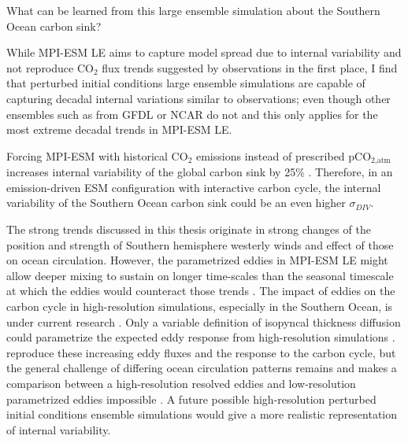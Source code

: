 \vspace{.5cm}

\label{sec:conlcusions}
What can be learned from this large ensemble simulation about the Southern Ocean carbon sink? 

While \acs{MPI-ESM LE} aims to capture model spread due to internal variability and not reproduce CO$_2$ flux trends suggested by observations in the first place, I find that perturbed initial conditions large ensemble simulations are capable of capturing decadal internal variations similar to observations; even though other ensembles such as from \acs{GFDL} or \acs{NCAR} do not and this only applies for the most extreme decadal trends in \acs{MPI-ESM LE}.

Forcing \acs{MPI-ESM} with historical CO$_2$ emissions instead of prescribed pCO$_{\text{2,atm}}$ increases internal variability of the global carbon sink by 25\% \citep{Ilyina2013}. Therefore, in an emission-driven \acs{ESM} configuration with interactive carbon cycle, the internal variability of the Southern Ocean carbon sink could be an even higher $\sigma_{DIV}$. 

The strong trends discussed in this thesis originate in strong changes of the position and strength of Southern hemisphere westerly winds and effect of those on ocean circulation. However, the parametrized eddies in \acs{MPI-ESM LE} might allow deeper mixing to sustain on longer time-scales than the seasonal timescale at which the eddies would counteract those trends \citep{Thompson2011}. The impact of eddies on the carbon cycle in high-resolution simulations, especially in the Southern Ocean, is under current research \citep{Ito2010,Dufour2013,Gnanadesikan2015,Meredith2016}. Only a variable definition of isopyncal thickness diffusion could parametrize the expected eddy response from high-resolution simulations \citep{Gent2011}. \cite{Lovenduski2013} reproduce these increasing eddy fluxes and the response to the carbon cycle, but the general challenge of differing ocean circulation patterns remains and makes a comparison between a high-resolution resolved eddies and low-resolution parametrized eddies impossible \citep{Bryan2014}. %
A future possible high-resolution perturbed initial conditions ensemble simulations would give a more realistic representation of internal variability.\newline



